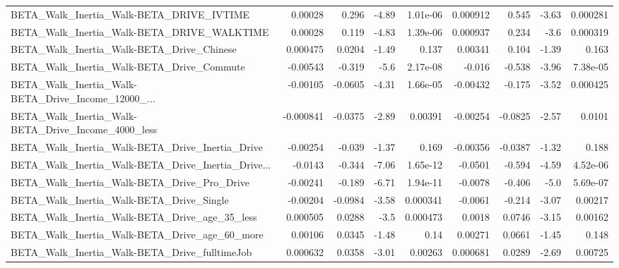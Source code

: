 \begin{tabular}{lrrrrrrrr}
BETA\_Walk\_Inertia\_Walk-BETA\_DRIVE\_IVTIME           &     0.00028 &        0.296 &    -4.89 & 1.01e-06 &   0.000912 &       0.545 &        -3.63 &      0.000281 \\
BETA\_Walk\_Inertia\_Walk-BETA\_DRIVE\_WALKTIME         &     0.00028 &        0.119 &    -4.83 & 1.39e-06 &   0.000937 &       0.234 &         -3.6 &      0.000319 \\
BETA\_Walk\_Inertia\_Walk-BETA\_Drive\_Chinese          &    0.000475 &       0.0204 &    -1.49 &    0.137 &    0.00341 &       0.104 &        -1.39 &         0.163 \\
BETA\_Walk\_Inertia\_Walk-BETA\_Drive\_Commute          &    -0.00543 &       -0.319 &     -5.6 & 2.17e-08 &     -0.016 &      -0.538 &        -3.96 &      7.38e-05 \\
BETA\_Walk\_Inertia\_Walk-BETA\_Drive\_Income\_12000\_... &    -0.00105 &      -0.0605 &    -4.31 & 1.66e-05 &   -0.00432 &      -0.175 &        -3.52 &      0.000425 \\
BETA\_Walk\_Inertia\_Walk-BETA\_Drive\_Income\_4000\_less &   -0.000841 &      -0.0375 &    -2.89 &  0.00391 &   -0.00254 &     -0.0825 &        -2.57 &        0.0101 \\
BETA\_Walk\_Inertia\_Walk-BETA\_Drive\_Inertia\_Drive    &    -0.00254 &       -0.039 &    -1.37 &    0.169 &   -0.00356 &     -0.0387 &        -1.32 &         0.188 \\
BETA\_Walk\_Inertia\_Walk-BETA\_Drive\_Inertia\_Drive... &     -0.0143 &       -0.344 &    -7.06 & 1.65e-12 &    -0.0501 &      -0.594 &        -4.59 &      4.52e-06 \\
BETA\_Walk\_Inertia\_Walk-BETA\_Drive\_Pro\_Drive        &    -0.00241 &       -0.189 &    -6.71 & 1.94e-11 &    -0.0078 &      -0.406 &         -5.0 &      5.69e-07 \\
BETA\_Walk\_Inertia\_Walk-BETA\_Drive\_Single           &    -0.00204 &      -0.0984 &    -3.58 & 0.000341 &    -0.0061 &      -0.214 &        -3.07 &       0.00217 \\
BETA\_Walk\_Inertia\_Walk-BETA\_Drive\_age\_35\_less      &    0.000505 &       0.0288 &     -3.5 & 0.000473 &     0.0018 &      0.0746 &        -3.15 &       0.00162 \\
BETA\_Walk\_Inertia\_Walk-BETA\_Drive\_age\_60\_more      &     0.00106 &       0.0345 &    -1.48 &     0.14 &    0.00271 &      0.0661 &        -1.45 &         0.148 \\
BETA\_Walk\_Inertia\_Walk-BETA\_Drive\_fulltimeJob      &    0.000632 &       0.0358 &    -3.01 &  0.00263 &   0.000681 &      0.0289 &        -2.69 &       0.00725 \\

\end{tabular}
